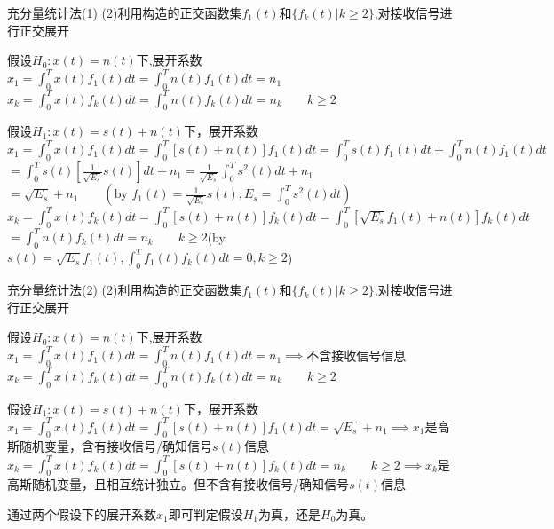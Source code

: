 \begin{frame}{充分量统计法(1)}
(2)利用构造的正交函数集$f_1(t)$和$\{f_k(t)|k\ge 2\}$,对接收信号进行正交展开
\begin{block}{假设$H_0:x(t)=n(t)$下,展开系数}	
	$x_1=\int_{0}^{T}x(t)f_1(t)dt=\int_{0}^{T}n(t)f_1(t)dt=n_1$\\
	
	$x_k=\int_{0}^{T}x(t)f_k(t)dt=\int_{0}^{T}n(t)f_k(t)dt=n_k\qquad k\ge 2$
\end{block}
\begin{block}{假设$H_1:x(t)=s(t)+n(t)$下，展开系数}
	$x_1=\int_{0}^{T}x(t)f_1(t)dt=\int_{0}^{T}[s(t)+n(t)]f_1(t)dt=\int_{0}^{T}s(t)f_1(t)dt+\int_{0}^{T}n(t)f_1(t)dt$\\
	$=\int_{0}^{T}s(t)[\frac{1}{\sqrt{E_s}}s(t)]dt+n_1=\frac{1}{\sqrt{E_s}}\int_{0}^{T}s^2(t)dt+n_1$\\
	$=\sqrt{E_s}+n_1\qquad (\text{by }f_1(t)=\frac{1}{\sqrt{E_s}}s(t),E_s=\int_{0}^{T}s^2(t)dt)$\\
	
	$x_k=\int_{0}^{T}x(t)f_k(t)dt=\int_{0}^{T}[s(t)+n(t)]f_k(t)dt=\int_{0}^{T}[\sqrt{E_s}f_1(t)+n(t)]f_k(t)dt$\\
	$=\int_{0}^{T}n(t)f_k(t)dt=n_k\qquad k\ge 2$\qquad (by\quad $s(t)=\sqrt{E_s}f_1(t), \int_{0}^{T}f_1(t)f_k(t)dt=0,k\ge 2$)
\end{block}
\end{frame}

\begin{frame}{充分量统计法(2)}
(2)利用构造的正交函数集$f_1(t)$和$\{f_k(t)|k\ge 2\}$,对接收信号进行正交展开
\begin{block}{假设$H_0:x(t)=n(t)$下,展开系数}	
	$x_1=\int_{0}^{T}x(t)f_1(t)dt=\int_{0}^{T}n(t)f_1(t)dt=n_1\implies$不含接收信号信息\\
	
	$x_k=\int_{0}^{T}x(t)f_k(t)dt=\int_{0}^{T}n(t)f_k(t)dt=n_k\qquad k\ge 2$
\end{block}
\begin{block}{假设$H_1:x(t)=s(t)+n(t)$下，展开系数}
	$x_1=\int_{0}^{T}x(t)f_1(t)dt=\int_{0}^{T}[s(t)+n(t)]f_1(t)dt=\sqrt{E_s}+n_1\implies x_1$是高斯随机变量，含有接收信号/确知信号$s(t)$信息 \\
	$x_k=\int_{0}^{T}x(t)f_k(t)dt=\int_{0}^{T}[s(t)+n(t)]f_k(t)dt=n_k\qquad k\ge 2\implies x_k$是高斯随机变量，且相互统计独立。但不含有接收信号/确知信号$s(t)$信息 \\
\end{block}
\begin{block}{通过两个假设下的展开系数$x_1$即可判定假设$H_1$为真，还是$H_0$为真。}
\end{block}
\end{frame}


